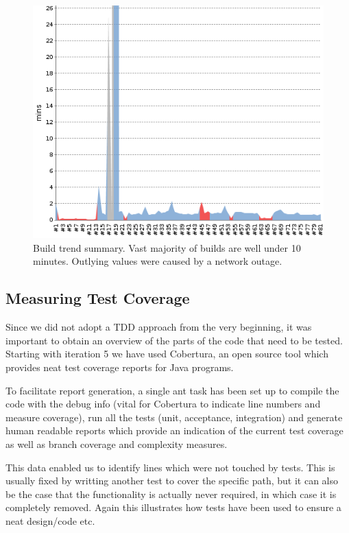 \documentclass[10pt]{article}
\begin{document}
\begin{figure}[ht]
\centering
\includegraphics[bb=0 0 500 400, scale = 0.6]{build-trend.png}
\caption{Build trend summary. Vast majority of builds are well under 10 minutes. Outlying values were caused by a network outage.}
\end{figure}

\subsection{Measuring Test Coverage}

Since we did not adopt a TDD approach from the very beginning, it was important to obtain an overview of the parts of the code that need to be tested. Starting with iteration 5 we have used Cobertura,  an open source tool which provides neat test coverage reports for Java programs.

To facilitate report generation, a single ant task has been set up to compile the code with the debug info (vital for Cobertura to indicate line numbers and measure coverage), run all the tests (unit, acceptance, integration) and generate human readable reports which provide an indication of the current test coverage as well as branch coverage and complexity measures.

This data enabled us to identify lines which were not touched by tests. This is usually fixed by writting another test to cover the specific path, but it can also be the case that the functionality is actually never required, in which case it is completely removed. Again this illustrates how tests have been used to ensure a neat design/code etc. 
\end{document}
